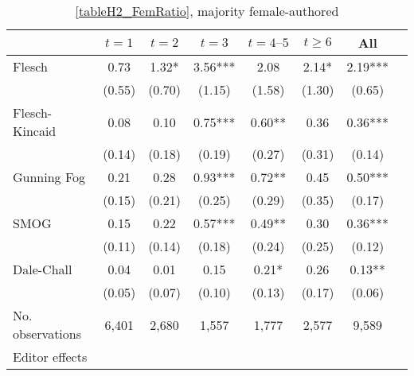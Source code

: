 \begin{table}
    \footnotesize
    \centering
    \begin{threeparttable}
        \caption{\autoref{tableH2_FemRatio}, majority female-authored}
        \label{tableH2_Fem50}
        \begin{tabular}{p{3cm}S@{}S@{}S@{}S@{}S@{}S@{}S@{}}
            \toprule
            &{\(t=1\)}&{\(t=2\)}&{\(t=3\)}&{\(t=4\text{--}5\)}&{\(t\ge6\)}&{All}\\
            \midrule
            Flesch                        &        0.73   &        1.32*  &        3.56***&        2.08   &        2.14*  &        2.19***\\
                                          &      (0.55)   &      (0.70)   &      (1.15)   &      (1.58)   &      (1.30)   &      (0.65)   \\
            Flesch-Kincaid                &        0.08   &        0.10   &        0.75***&        0.60** &        0.36   &        0.36***\\
                                          &      (0.14)   &      (0.18)   &      (0.19)   &      (0.27)   &      (0.31)   &      (0.14)   \\
            Gunning Fog                   &        0.21   &        0.28   &        0.93***&        0.72** &        0.45   &        0.50***\\
                                          &      (0.15)   &      (0.21)   &      (0.25)   &      (0.29)   &      (0.35)   &      (0.17)   \\
            SMOG                          &        0.15   &        0.22   &        0.57***&        0.49** &        0.30   &        0.36***\\
                                          &      (0.11)   &      (0.14)   &      (0.18)   &      (0.24)   &      (0.25)   &      (0.12)   \\
            Dale-Chall                    &        0.04   &        0.01   &        0.15   &        0.21*  &        0.26   &        0.13** \\
                                          &      (0.05)   &      (0.07)   &      (0.10)   &      (0.13)   &      (0.17)   &      (0.06)   \\
            \midrule
            No. observations              &       6,401   &       2,680   &       1,557   &       1,777   &       2,577   &       9,589   \\
            \midrule
            Editor effects       &           {}   &           {}   &           {}   &           {}   &           {}   &           {}   \\

\end{tabular}
\end{threeparttable}
\end{table}
